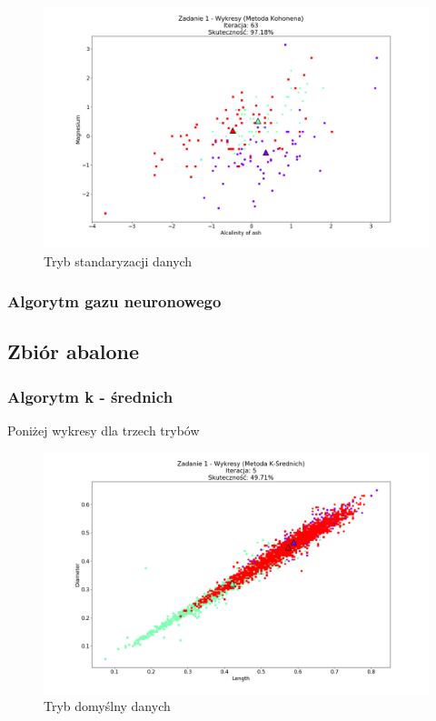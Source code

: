 \documentclass{classrep}
\begin{document}
{{{				\begin{figure}[!htbp]
					\centering
					\includegraphics[width=\textwidth,width=95mm]{wykresy/plot_kohonenWineStandardised.png}
					\caption{Tryb standaryzacji danych}
				\end{figure}
			\FloatBarrier
		}

		\subsubsection{Algorytm gazu neuronowego}
		{

		}
	}
	\subsection{Zbiór abalone}
	{
		\subsubsection{Algorytm k - średnich}
		{
			Poniżej wykresy dla trzech trybów
				\begin{figure}[!htbp]
					\centering
					\includegraphics[width=\textwidth,width=95mm]{wykresy/plot_k_meansAbaloneDefault.png}
					\caption{Tryb domyślny danych}
				\end{figure}
			
}}}
\end{document}
